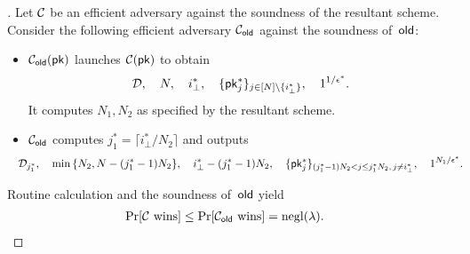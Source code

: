 \begin{proof}[]
Let ${\mathcal{C}}$ be an efficient adversary against the soundness of the resultant scheme.
Consider the following efficient adversary $\scriptC_\OLD$ against the soundness of~$\OLD$:
\begin{itemize}
\item $\scriptC_\OLD(\pk)$ launches $\scriptC(\pk)$ to obtain
\begin{align*}
\scriptD,\quad
N,\quad
i^\ast_\bot,\quad
\{\pk^\ast_j\}_{j\in{[N]\setminus\{i^\ast_\bot\}}},\quad
1^{1/\epsilon^\ast}.
\end{align*}
It computes $N_1,N_2$ as specified by the resultant scheme.
\item $\scriptC_\OLD$ computes ${j^\ast_1=\lceil i^\ast_\bot/N_2\rceil}$
and outputs
\begin{align*}
\WideNarrow{\hspace*{-1em}}{}
\scriptD_{j^\ast_1},\quad
&{}\min{\{N_2,N-(j^\ast_1-1)N_2\}},\quad
i^\ast_\bot-(j^\ast_1-1)N_2,
\WideNarrow{\quad}{\\&}
\{\pk^\ast_j\}_{(j^\ast_1-1)N_2<j\leq j^\ast_1N_2,\,j\neq i^\ast_\bot},\quad
1^{N_1/\epsilon^\ast}.
\end{align*}
\end{itemize}
Routine calculation and the soundness of~$\OLD$ yield
\begin{align*}
\Pr[\scriptC\textup{ wins}]
&{}\leq
\Pr[\scriptC_\OLD\textup{ wins}]
=
\negl(\lambda).
\qedhere
\end{align*}
\end{proof}
